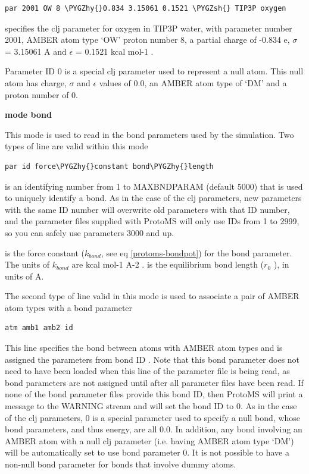 \documentclass[letterpaper,10pt,english]{sphinxmanual}
\def\PYGZsh{\char`\#}
\def\PYGZhy{\char`\-}
\begin{document}
\begin{Verbatim}[commandchars=\\\{\}]
par 2001 OW 8 \PYGZhy{}0.834 3.15061 0.1521 \PYGZsh{} TIP3P oxygen
\end{Verbatim}

specifies the clj parameter for oxygen in TIP3P water, with parameter number 2001, AMBER atom type ‘OW’ proton number 8, a partial charge of -0.834 \textbar{}e\textbar{}, \(\sigma\) = 3.15061 A and \(\epsilon\) = 0.1521 kcal mol-1 .

Parameter ID 0 is a special clj parameter used to represent a null atom. This null atom has charge, \(\sigma\) and \(\epsilon\) values of 0.0, an AMBER atom type of ‘DM’ and a proton number of 0.

\textbf{mode bond}

This mode is used to read in the bond parameters used by the simulation. Two types of line are valid within this mode

\begin{Verbatim}[commandchars=\\\{\}]
par id force\PYGZhy{}constant bond\PYGZhy{}length
\end{Verbatim}

 is an identifying number from 1 to MAXBNDPARAM (default 5000) that is used to uniquely identify a bond. As in the case of the clj parameters, new parameters with the same ID number will overwrite old parameters with that ID number, and the parameter files supplied with ProtoMS will only use IDs from 1 to 2999, so you can safely use parameters 3000 and up.

 is the force constant (\(k_{bond}\), see eq \eqref{protoms-bondpot}) for the bond parameter. The units of \(k_{bond}\) are kcal mol-1 A-2 .  is the equilibrium bond length (\(r_0\) ), in units of A.

The second type of line valid in this mode is used to associate a pair of AMBER atom types with a bond parameter

\begin{Verbatim}[commandchars=\\\{\}]
atm amb1 amb2 id
\end{Verbatim}

This line specifies the bond between atoms with AMBER atom types  and  is assigned the parameters from bond ID . Note that this bond parameter does not need to have been loaded when this line of the parameter file is being read, as bond parameters are not assigned until after all parameter files have been read. If none of the bond parameter files provide this bond ID, then ProtoMS will print a message to the WARNING stream and will set the bond ID to 0. As in the case of the clj parameters, 0 is a special parameter used to specify a null bond, whose bond parameters, and thus energy, are all 0.0. In addition, any bond involving an AMBER atom with a null clj parameter (i.e. having AMBER atom type ‘DM’) will be automatically set to use bond parameter 0. It is not possible to have a non-null bond parameter for bonds that involve dummy atoms.
\end{document}
